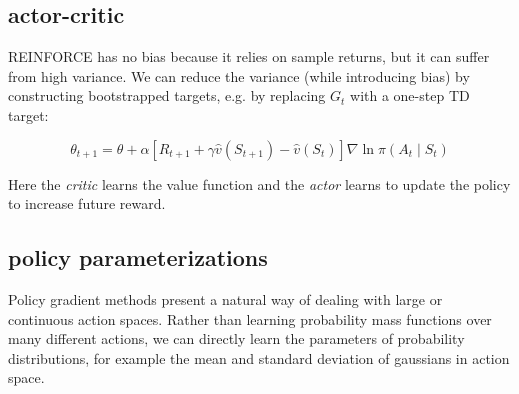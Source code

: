 \subsection{actor-critic}
REINFORCE has no bias because it relies on sample returns, but it can suffer from high variance. We can reduce the variance (while introducing bias) by constructing bootstrapped targets, e.g. by replacing $G_t$ with a one-step TD target:

$$ \theta_{t+1} = \theta + \alpha \left[R_{t+1} + \gamma \hat{v}(S_{t+1}) - \hat{v}(S_t) \right] \nabla \ln \pi (A_t \mid S_t)$$

Here the \textit{critic} learns the value function and the \textit{actor} learns to update the policy to increase future reward.  

\subsection{policy parameterizations}
Policy gradient methods present a natural way of dealing with large or continuous action spaces. Rather than learning probability mass functions over many different actions, we can directly learn the parameters of probability distributions, for example the mean and standard deviation of gaussians in action space.
